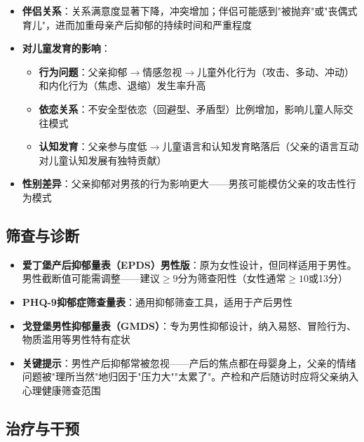 \begin{itemize}[leftmargin=2cm]
	\item \textbf{伴侣关系}：关系满意度显著下降，冲突增加；伴侣可能感到"被抛弃"或"丧偶式育儿"，进而加重母亲产后抑郁的持续时间和严重程度
	\item \textbf{对儿童发育的影响}：
	\begin{itemize}
		\item \textbf{行为问题}：父亲抑郁$\rightarrow$情感忽视$\rightarrow$儿童外化行为（攻击、多动、冲动）和内化行为（焦虑、退缩）发生率升高
		\item \textbf{依恋关系}：不安全型依恋（回避型、矛盾型）比例增加，影响儿童人际交往模式
		\item \textbf{认知发育}：父亲参与度低$\rightarrow$儿童语言和认知发育略落后（父亲的语言互动对儿童认知发展有独特贡献）
	\end{itemize}
	\item \textbf{性别差异}：父亲抑郁对男孩的行为影响更大——男孩可能模仿父亲的攻击性行为模式
\end{itemize}

\subsection{筛查与诊断}

\begin{itemize}[leftmargin=2cm]
	\item \textbf{爱丁堡产后抑郁量表（EPDS）男性版}：原为女性设计，但同样适用于男性。男性截断值可能需调整——建议$\geq 9$分为筛查阳性（女性通常$\geq 10$或13分）
	\item \textbf{PHQ-9抑郁症筛查量表}：通用抑郁筛查工具，适用于产后男性
	\item \textbf{戈登堡男性抑郁量表（GMDS）}：专为男性抑郁设计，纳入易怒、冒险行为、物质滥用等男性特有症状
	\item \textbf{关键提示}：男性产后抑郁常被忽视——产后的焦点都在母婴身上，父亲的情绪问题被"理所当然"地归因于"压力大""太累了"。产检和产后随访时应将父亲纳入心理健康筛查范围
\end{itemize}

\subsection{治疗与干预}

